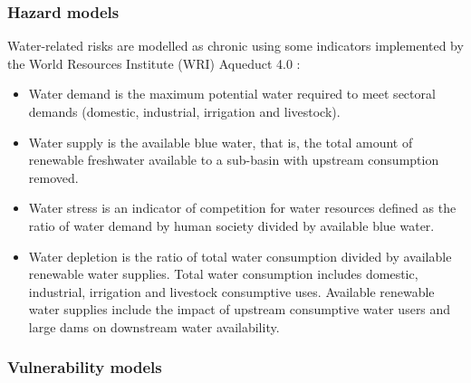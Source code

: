 \documentclass[a4paper,11pt]{extarticle} %
\theoremstyle{definition}
\begin{document}
\subsubsection{Hazard models}
Water-related risks are modelled as chronic using some indicators implemented by the World Resources Institute (WRI) Aqueduct 4.0 \cite{KuzmaEtAl:2023}:
\begin{itemize}
\item Water demand is the maximum potential water required to meet sectoral demands (domestic, industrial, irrigation and livestock).
\item Water supply is the available blue water, that is, the total amount of renewable freshwater available to a sub-basin with upstream consumption removed.
\item Water stress is an indicator of competition for water resources defined as the ratio of water demand by human society divided by available blue water.
\item Water depletion is the ratio of total water consumption divided by available renewable water supplies. Total water consumption includes domestic, industrial, irrigation and livestock consumptive uses. Available renewable water supplies include the impact of upstream consumptive water users and large dams on downstream water availability.
\end{itemize}
\subsubsection{Vulnerability models}
\end{document}
